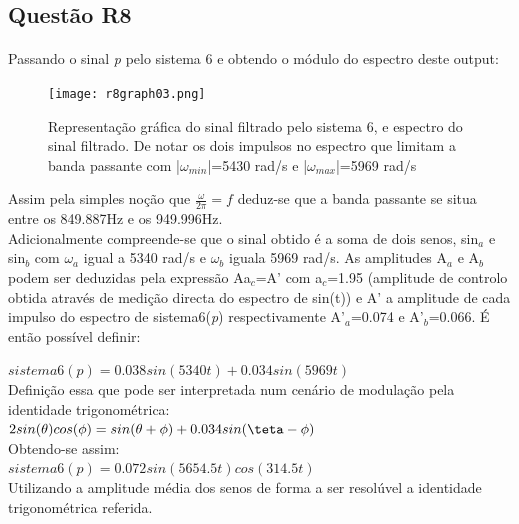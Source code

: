 \documentclass[a4paper,12pt]{article}
\begin{document}
			\subsection{Questão R8}
			\paragraph{}
			Passando o sinal \textit{p} pelo sistema 6 e obtendo o módulo do espectro deste output:
			\begin{figure}[H]
                                    \centering
                                    \captionsetup{justification=centering}
                                    \texttt{[image: r8graph03.png]}
                                \caption{Representação gráfica do sinal filtrado pelo     sistema 6, e espectro do sinal filtrado. De notar os dois impulsos no espectro que limitam a banda passante com |$\omega _{min}$|=5430 rad/s e |$\omega_{max}$|=5969 rad/s}
                            \end{figure}
			Assim pela simples noção que $\frac{\omega}{2\pi} = f$ deduz-se que a banda passante se situa entre os 849.887Hz e os 949.996Hz.\\
			Adicionalmente compreende-se que o sinal obtido é a soma de dois senos, sin$_a$ e sin$_b$ com $\omega$$_a$ igual a 5340 rad/s e $\omega$$_b$ iguala 5969 rad/s. As amplitudes A$_a$ e A$_b$ podem ser deduzidas pela expressão Aa$_c$=A' com a$_c$=1.95 (amplitude de controlo obtida através de medição directa do espectro de sin(t)) e A' a amplitude de cada impulso do espectro de sistema6(\textit{p}) respectivamente A'$_a$=0.074 e A'$_b$=0.066. É então possível definir:
			\begin{center}
                                  \begin{math}
                                    sistema6(p)=0.038sin(5340t)+0.034sin(5969t)
                                  \end{math}
				  \mbox{}\\[0.5 cm]
				  Definição essa que pode ser interpretada num cenário de modulação pela identidade trigonométrica:\\
				  \begin{math}
                                      2sin(\theta)cos(\phi)=sin(\theta + \phi)+0.034sin(\teta - \phi)
                                    \end{math}
				  \mbox{}\\[0.5 cm] Obtendo-se assim:\\
				  \begin{math}
                                      sistema6(p)=0.072sin(5654.5t)cos(314.5t)                                    \end{math}
                        \mbox{}\\[0.5 cm]Utilizando a amplitude média dos senos de forma a ser resolúvel a identidade trigonométrica referida.
			\end{center}
\end{document}
